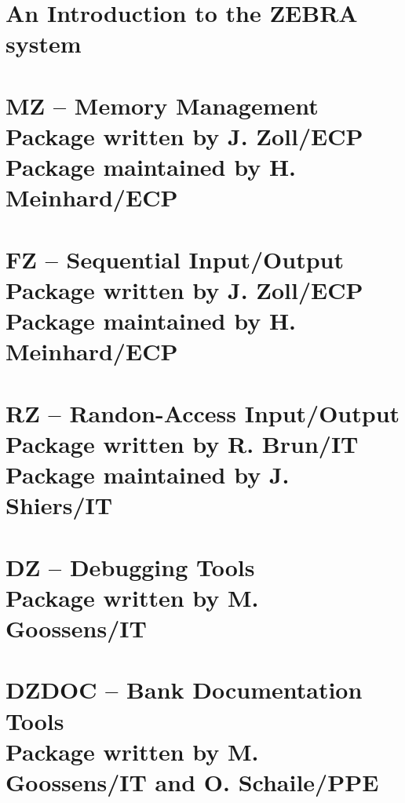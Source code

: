 \documentclass[11pt,dvips]{cernman}
\begin{document}

\setcounter{page}{1}
\part{An Introduction to the ZEBRA system}

\part[MZ -- Memory Management]%
     {MZ -- Memory Management\\[5cm]%
      {\LARGE Package written by J. Zoll/ECP}\\[1cm]
      {\LARGE Package maintained by H. Meinhard/ECP}}





\part[FZ -- Sequential Input/Output]%
     {FZ -- Sequential Input/Output\\[5cm]%
      {\LARGE Package written by J. Zoll/ECP}\\[1cm]
      {\LARGE Package maintained by H. Meinhard/ECP}}





\part[RZ -- Randon-Access Input/Output]%
     {RZ -- Randon-Access Input/Output\\[5cm]%
      {\LARGE Package written by R. Brun/IT}\\[1cm]
      {\LARGE Package maintained by J. Shiers/IT}}


\part[DZ -- Debugging Tools]%
     {DZ -- Debugging Tools\\[5cm]%
      {\LARGE Package written by M. Goossens/IT}}


\part[DZDOC -- Bank Documentation Tools]%
     {DZDOC -- Bank Documentation Tools\\[5cm]%
      {\LARGE Package written by M. Goossens/IT and O. Schaile/PPE}}
\begingroup

\endgroup
\end{document}
